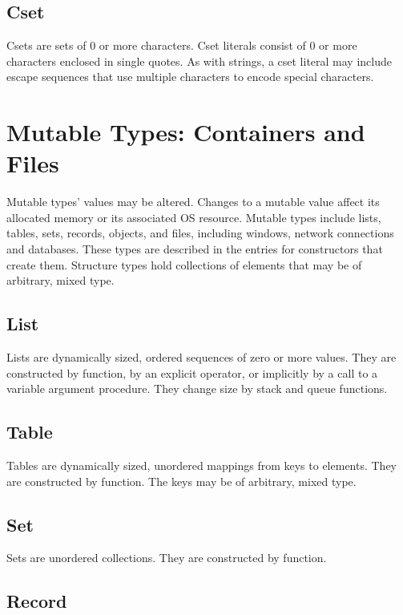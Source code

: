 \subsection*{Cset}

Csets are sets of 0 or more characters. Cset literals
consist of 0 or more characters enclosed in single quotes. As with
strings, a cset literal may include escape
sequences that use multiple characters to encode special characters.

\section{Mutable Types: Containers and Files}

Mutable types' values may be altered. Changes to a
mutable value affect its allocated memory or its
associated OS resource. Mutable types include lists, tables,
sets, records, objects, and files, including windows, network
connections and databases. These types are described in
the entries for constructors that
create them. Structure types hold
collections of elements that may be of arbitrary, mixed type.

\subsection*{List}

Lists are dynamically sized, ordered sequences of zero or
more values. They are constructed by function, by an explicit
operator, or implicitly by a call to a variable argument procedure.
They change size by stack and queue functions.

\subsection*{Table}

Tables are dynamically sized, unordered mappings from keys
to elements. They are constructed by function. The keys may be of
arbitrary, mixed type.

\subsection*{Set}

Sets are unordered collections. They are constructed by function.

\subsection*{Record}

